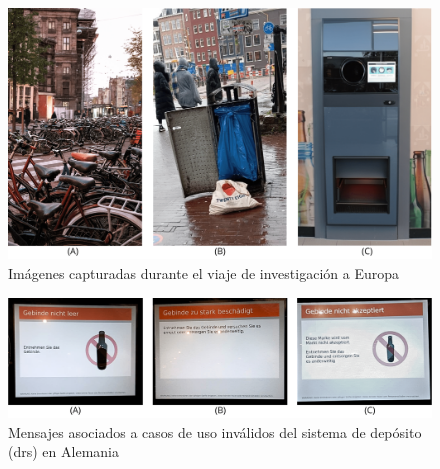 \begin{figure}[!htb]
	\centering
	\includegraphics[width=\linewidth]{Figures/europe-pictures.png}
	\caption{Imágenes capturadas durante el viaje de investigación a Europa}
	\label{fig:europe-pictures}
\end{figure}

\begin{figure}[!htb]
	\centering
	\includegraphics[width=\linewidth]{Figures/europe-pfand-cases.png}
	\caption{Mensajes asociados a casos de uso inválidos del sistema de depósito (\gls{drs}) en Alemania}
	\label{fig:europe-pfand-cases}
\end{figure}
